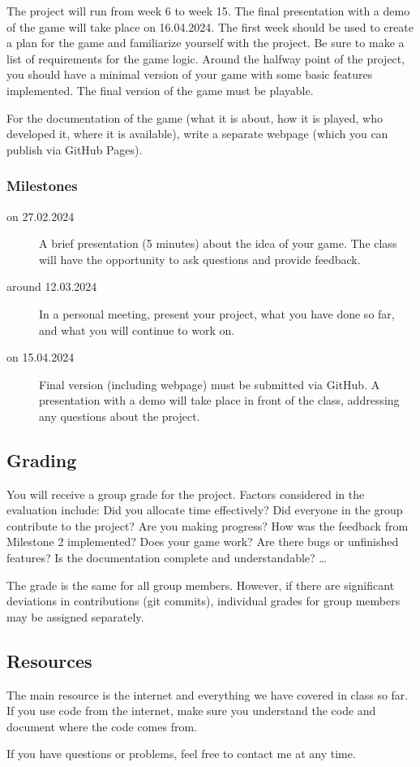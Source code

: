 \documentclass[11pt,a4paper]{report}
\begin{document}
The project will run from week 6 to week 15. The final presentation with a demo of the game will take place on 16.04.2024. The first week should be used to create a plan for the game and familiarize yourself with the project. Be sure to make a list of requirements for the game logic. Around the halfway point of the project, you should have a minimal version of your game with some basic features implemented. The final version of the game must be playable.

For the documentation of the game (what it is about, how it is played, who developed it, where it is available), write a separate webpage (which you can publish via GitHub Pages).

\subsubsection{Milestones}
\begin{description}
    \item[on 27.02.2024] A brief presentation (5 minutes) about the idea of your game. The class will have the opportunity to ask questions and provide feedback.
\item[around 12.03.2024] In a personal meeting, present your project, what you have done so far, and what you will continue to work on.
    \item[on 15.04.2024] Final version (including webpage) must be submitted via GitHub. A presentation with a demo will take place in front of the class, addressing any questions about the project.
\end{description}

\subsection{Grading}

You will receive a group grade for the project. Factors considered in the evaluation include: Did you allocate time effectively? Did everyone in the group contribute to the project? Are you making progress? How was the feedback from Milestone 2 implemented? Does your game work? Are there bugs or unfinished features? Is the documentation complete and understandable? \dots

The grade is the same for all group members. However, if there are significant deviations in contributions (git commits), individual grades for group members may be assigned separately.

\newpage

\subsection{Resources}

The main resource is the internet and everything we have covered in class so far. If you use code from the internet, make sure you understand the code and document where the code comes from.

If you have questions or problems, feel free to contact me at any time.
\end{document}
